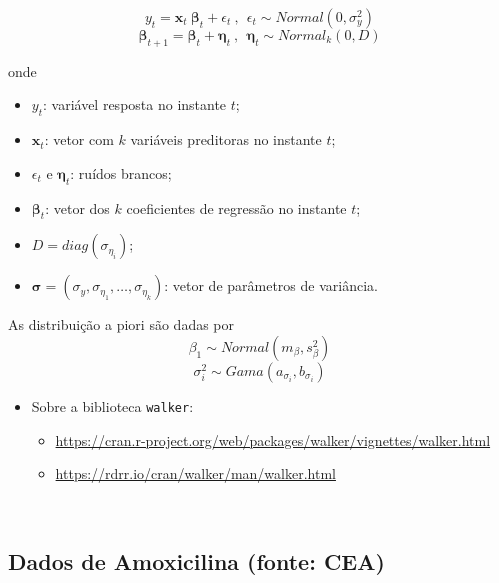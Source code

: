 \documentclass[
]{book}
\providecommand{\tightlist}{%
  \setlength{\itemsep}{0pt}\setlength{\parskip}{0pt}}
\begin{document}
\[y_t = \boldsymbol x_t~\boldsymbol\beta_t + \epsilon_t ~,~~ \epsilon_t \sim \textit{Normal}(0,\sigma_y^2)\]
\[\boldsymbol\beta_{t+1} = \boldsymbol\beta_t + \boldsymbol\eta_t ~,~~ \boldsymbol\eta_t \sim \textit{Normal}_k(0,D)\]

onde

\begin{itemize}
\item
  \(y_t\): variável resposta no instante \(t\);
\item
  \(\boldsymbol x_t\): vetor com \(k\) variáveis preditoras no instante \(t\);
\item
  \(\epsilon_t\) e \(\boldsymbol\eta_t\): ruídos brancos;
\item
  \(\boldsymbol\beta_t\): vetor dos \(k\) coeficientes de regressão no instante \(t\);
\item
  \(D=\textit{diag}({\sigma}_{\eta_i})\);
\item
  \(\boldsymbol\sigma=\left(\sigma_y,{\sigma}_{\eta_1},\ldots,{\sigma}_{\eta_k}\right)\): vetor de parâmetros de variância.
\end{itemize}

As distribuição a piori são dadas por
\[\beta_1 \sim \textit{Normal}(m_\beta,{s}_\beta^2)\]
\[\sigma_i^2 \sim \textit{Gama}({a}_{\sigma_i},{b}_{\sigma_i})\]

\begin{itemize}
\tightlist
\item
  Sobre a biblioteca \texttt{walker}:

  \begin{itemize}
  \tightlist
  \item
    \url{https://cran.r-project.org/web/packages/walker/vignettes/walker.html}
  \item
    \url{https://rdrr.io/cran/walker/man/walker.html}
  \end{itemize}
\end{itemize}

\(~\)

\hypertarget{dados-de-amoxicilina-fonte-cea}{%
\subsection{Dados de Amoxicilina (fonte: CEA)}\label{dados-de-amoxicilina-fonte-cea}}
\end{document}
